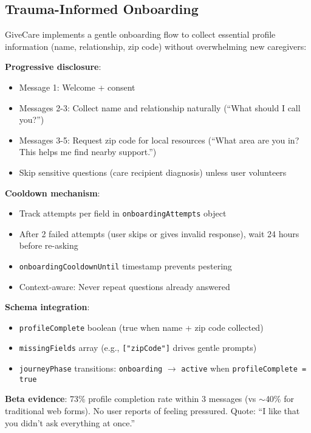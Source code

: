 \documentclass{article}
\begin{document}
\subsection{Trauma{-}Informed Onboarding}%
\label{subsec:Trauma{-}InformedOnboarding}%
GiveCare implements a gentle onboarding flow to collect essential profile information (name, relationship, zip code) without overwhelming new caregivers:

\textbf{Progressive disclosure}:
\begin{itemize}
    \item Message 1: Welcome + consent
    \item Messages 2-3: Collect name and relationship naturally (``What should I call you?'')
    \item Messages 3-5: Request zip code for local resources (``What area are you in? This helps me find nearby support.'')
    \item Skip sensitive questions (care recipient diagnosis) unless user volunteers
\end{itemize}

\textbf{Cooldown mechanism}:
\begin{itemize}
    \item Track attempts per field in \texttt{onboardingAttempts} object
    \item After 2 failed attempts (user skips or gives invalid response), wait 24 hours before re-asking
    \item \texttt{onboardingCooldownUntil} timestamp prevents pestering
    \item Context-aware: Never repeat questions already answered
\end{itemize}

\textbf{Schema integration}:
\begin{itemize}
    \item \texttt{profileComplete} boolean (true when name + zip code collected)
    \item \texttt{missingFields} array (e.g., \texttt{["zipCode"]} drives gentle prompts)
    \item \texttt{journeyPhase} transitions: \texttt{onboarding} $\rightarrow$ \texttt{active} when \texttt{profileComplete = true}
\end{itemize}

\textbf{Beta evidence}: 73\% profile completion rate within 3 messages (vs $\sim$40\% for traditional web forms). No user reports of feeling pressured. Quote: ``I like that you didn't ask everything at once.''
\end{document}
